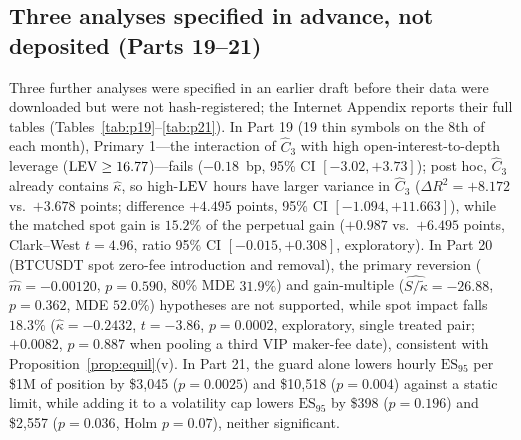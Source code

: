 \documentclass[12pt]{article}
\theoremstyle{definition}
\theoremstyle{remark}
\begin{document}
\subsection{Three analyses specified in advance, not deposited (Parts 19--21)}\label{sec:p1921}
Three further analyses were specified in an earlier draft before their data were downloaded but were not hash-registered; the Internet Appendix reports their full tables (Tables~\ref{tab:p19}--\ref{tab:p21}). In Part 19 (19 thin symbols on the 8th of each month), Primary 1---the interaction of $\hat C_3$ with high open-interest-to-depth leverage (${\rm LEV}\ge16.77$)---fails ($-0.18$~bp, 95\% CI $[-3.02,+3.73]$); post hoc, $\hat C_3$ already contains $\hat\kappa$, so high-${\rm LEV}$ hours have larger variance in $\hat C_3$ ($\Delta R^2=+8.172$ vs.\ $+3.678$ points; difference $+4.495$ points, 95\% CI $[-1.094,+11.663]$), while the matched spot gain is $15.2\%$ of the perpetual gain ($+0.987$ vs.\ $+6.495$ points, Clark--West $t=4.96$, ratio 95\% CI $[-0.015,+0.308]$, exploratory). In Part 20 (BTCUSDT spot zero-fee introduction and removal), the primary reversion ($\hat m=-0.00120$, $p=0.590$, 80\% MDE $31.9\%$) and gain-multiple ($\widehat{S/\tilde\kappa}=-26.88$, $p=0.362$, MDE $52.0\%$) hypotheses are not supported, while spot impact falls $18.3\%$ ($\hat\kappa=-0.2432$, $t=-3.86$, $p=0.0002$, exploratory, single treated pair; $+0.0082$, $p=0.887$ when pooling a third VIP maker-fee date), consistent with Proposition~\ref{prop:equil}(v). In Part 21, the guard alone lowers hourly $\mathrm{ES}_{95}$ per \$1M of position by \$3{,}045 ($p=0.0025$) and \$10{,}518 ($p=0.004$) against a static limit, while adding it to a volatility cap lowers $\mathrm{ES}_{95}$ by \$398 ($p=0.196$) and \$2{,}557 ($p=0.036$, Holm $p=0.07$), neither significant.
\end{document}
